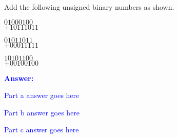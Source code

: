 \item{}
Add the following unsigned binary numbers as shown.
\begin{list}{\textbf{}}{}
    \item\noindent\phantom{$+$}$01000100$\\
    \underline{$+10111011$}\\
    \item\noindent\phantom{$+$}$01011011$\\
    \underline{$+00011111$}\\
    \item\noindent\phantom{$+$}$10101100$\\
    \underline{$+00100100$}\\
\end{list}
\vskip12pt
\ifanswers
\textcolor{blue}{
\textbf{Answer:}\\
\begin{list}{\textbf{}}{}
    \item Part a answer goes here
    \item Part b answer goes here
    \item Part c answer goes here
\end{list}
}
\newpage
\fi
